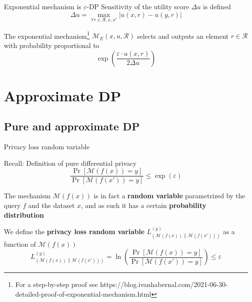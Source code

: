 \documentclass[12pt,aspectratio=169,handout]{beamer}
\begin{document}
\begin{frame}{Exponential mechanism is $\varepsilon$-DP}
Sensitivity of the utility score $\Delta u$ is defined
$$
\Delta u = \max_{\forall r \in \mathcal{R}, x, x'} |u(x, r) - u(y, r)|
$$

The exponential mechanism\footnote{
For a step-by-step proof see https://blog.ivanhabernal.com/2021-06-30-detailed-proof-of-exponential-mechanism.html
} $\mathcal{M}_E(x, u, \mathcal{R})$ selects and outputs an element $r \in \mathcal{R}$ with probability proportional to
$$\exp \left( \frac{\varepsilon \cdot u(x,r)}{2\Delta u}\right)$$

\end{frame}

\section{Approximate DP}

\subsection{Pure and approximate DP}

\begin{frame}{Privacy loss random variable}
\begin{block}{Recall: Definition of pure differential privacy}
$$
\frac{
	\Pr \left[ \mathcal{M}(f(x)) = y  \right]
}{
	\Pr \left[ \mathcal{M}(f(x')) = y  \right]
}
\leq \exp(\varepsilon)
$$	
\end{block}
The mechanism $\mathcal{M}(f(x))$ is in fact a \textbf{random variable} parametrized by the query $f$ and the dataset $x$, and as such it has a certain \textbf{probability distribution}

\begin{block}{We define the \textbf{privacy loss random variable} $L_{(\mathcal{M}(f(x)) \| \mathcal{M}(f(x')))}^{(y)}$ as a function of $\mathcal{M}(f(x))$}
$$
L_{(\mathcal{M}(f(x)) \| \mathcal{M}(f(x')))}^{(y)} =
\ln \left(
\frac{
	\Pr \left[ \mathcal{M}(f(x)) = y  \right]
}{
	\Pr \left[ \mathcal{M}(f(x')) = y  \right]
}
\right)
\leq \varepsilon
$$
\end{block}




\end{frame}
\end{document}
